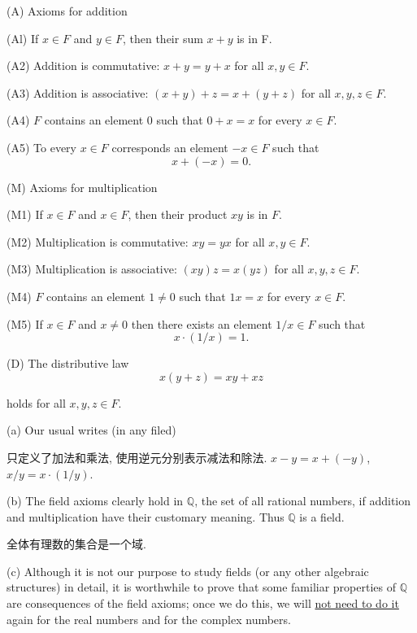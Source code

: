 \begin{Axiom}

(A) Axioms for addition

(Al) If $x\in F$  and $y \in F$, then their sum \(x + y\) is in F.

(A2) Addition is commutative: \(x + y=y+ x\) for all \(x, y \in F\).

(A3) Addition is associative: \((x+ y)+z = x + (y+ z)\) for all \(x, y, z \in F\).

(A4) $F$ contains an element $0$ such that $0 + x = x$ for every $x \in F$.

(A5) To every $x\in F$ corresponds an element $-x\in F$ such that
\begin{equation*}
    x+(-x)=0.
\end{equation*}

(M) Axioms for multiplication

(M1) If $x\in F$ and $x\in F$, then their product $xy$ is in $F$.

(M2) Multiplication is commutative: $xy = yx$ for all $x, y \in  F$.

(M3) Multiplication is associative: $(xy)z = x(yz)$ for all $x, y, z \in  F$.

(M4) $F$ contains an element $1 \neq 0$ such that $1x = x$ for every $x \in F$.

(M5) If $x \in F$ and $x \neq 0$ then there exists an element $1/x \in F$ such that
\begin{equation*}
    x\cdot(1/x)=1.
\end{equation*}

(D) The distributive law
\begin{equation*}
    x(y+z)=xy+ xz
\end{equation*}

holds for all $x, y, z \in F$.
\end{Axiom}

\begin{Remark}
(a) Our usual writes (in any filed)

只定义了加法和乘法, 使用逆元分别表示减法和除法.
$x-y = x+(-y)$, $x/y=x\cdot (1/y)$.

(b) The field axioms clearly hold in $\mathbb{Q}$, the set of all rational numbers, if
addition and multiplication have their customary meaning. Thus $\mathbb{Q}$ is a
field.

全体有理数的集合是一个域.

(c) Although it is not our purpose to study fields (or any other algebraic
structures) in detail, it is worthwhile to prove that some familiar properties
of $\mathbb{Q}$ are consequences of the field axioms; once we do this, we will \underline{not
need to do it} again for the real numbers and for the complex numbers.
\end{Remark}

